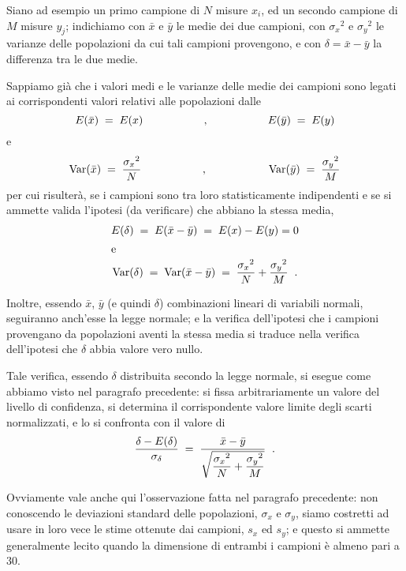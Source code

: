 Siano ad esempio un primo campione di $N$ misure $x_i$, ed
un secondo campione di $M$ misure $y_j$; indichiamo con
$\bar x$ e $\bar y$ le medie dei due campioni, con
${\sigma_x}^2$ e ${\sigma_y}^2$ le varianze delle
popolazioni da cui tali campioni provengono, e con $\delta =
\bar x - \bar y$ la differenza tra le due medie.

Sappiamo gi\`a che i valori medi e le varianze delle medie
dei campioni sono legati ai corrispondenti valori relativi
alle popolazioni dalle
\begin{equation*}
  E(\bar x) \; = \; E(x)
    \makebox[4cm]{\mbox{,}}
    E(\bar y) \; = \; E(y)
\end{equation*}
e
\begin{equation*}
  \var (\bar x) \; = \; \frac{{\sigma_x}^2}{N}
    \makebox[4cm]{\mbox{,}}
    \var (\bar y) \; = \; \frac{{\sigma_y}^2}{M}
\end{equation*}
per cui risulter\`a, se i campioni sono tra loro
statisticamente indipendenti e se si ammette valida
l'ipotesi (da verificare) che abbiano la stessa media,
\begin{gather*}
  E(\delta) \; = \; E(\bar x - \bar y)
    \; =  \;E(x) - E(y) = 0 \\
  \intertext{e}
  \operatorname{Var} (\delta) \; = \;
    \operatorname{Var} (\bar x - \bar y) \; = \;
    \frac{{\sigma_x}^2}{N} + \frac{{\sigma_y}^2}{M} \;\; .
\end{gather*}

Inoltre, essendo $\bar x$, $\bar y$ (e quindi $\delta$)
combinazioni lineari di variabili normali, seguiranno
anch'esse la legge normale; e la verifica dell'ipotesi che i
campioni provengano da popolazioni aventi la stessa media si
traduce nella verifica dell'ipotesi che $\delta$ abbia
valore vero nullo.

Tale verifica, essendo $\delta$ distribuita secondo la legge
normale, si esegue come abbiamo visto nel paragrafo
precedente: si fissa arbitrariamente un valore del livello
di confidenza, si determina il corrispondente valore limite
degli scarti normalizzati, e lo si confronta con il valore
di
\begin{equation*}
  \frac{\delta - E(\delta)}{\sigma_\delta} \; = \;
    \frac{\bar x - \bar y}{\sqrt{
    \dfrac{{\sigma_x}^2}{N} +
    \dfrac{{\sigma_y}^2}{M}}} \;\; .
\end{equation*}

Ovviamente vale anche qui l'osservazione fatta nel paragrafo
precedente: non conoscendo le deviazioni standard delle
popolazioni, $\sigma_x$ e $\sigma_y$, siamo costretti ad
usare in loro vece le stime ottenute dai campioni, $s_x$ ed
$s_y$; e questo si ammette generalmente lecito quando la
dimensione di entrambi i campioni \`e almeno pari a 30.

